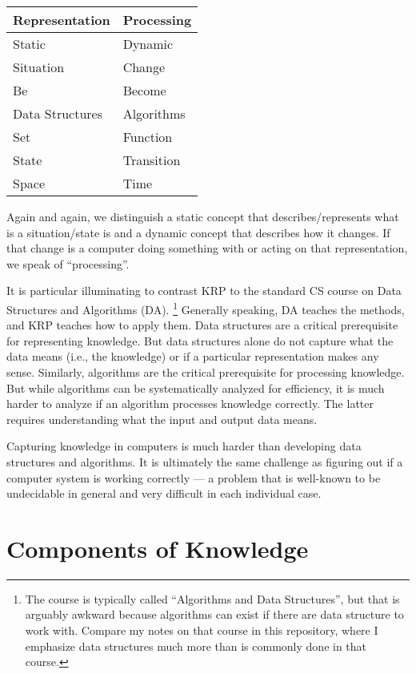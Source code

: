 \begin{center}
\begin{tabular}{l|l}
Representation & Processing \\
\hline
Static & Dynamic \\
Situation & Change \\
Be & Become \\
Data Structures & Algorithms \\
Set & Function \\
State & Transition \\
Space & Time
\end{tabular}
\end{center}

Again and again, we distinguish a static concept that describes/represents what is a situation/state is and a dynamic concept that describes how it changes.
If that change is a computer doing something with or acting on that representation, we speak of ``processing''.

It is particular illuminating to contrast KRP to the standard CS course on Data Structures and Algorithms (DA).%
\footnote{The course is typically called ``Algorithms and Data Structures'', but that is arguably awkward because algorithms can exist if there are data structure to work with. Compare my notes on that course in this repository, where I emphasize data structures much more than is commonly done in that course.}
Generally speaking, DA teaches the methods, and KRP teaches how to apply them.
Data structures are a critical prerequisite for representing knowledge.
But data structures alone do not capture what the data means (i.e., the knowledge) or if a particular representation makes any sense.
Similarly, algorithms are the critical prerequisite for processing knowledge.
But while algorithms can be systematically analyzed for efficiency, it is much harder to analyze if an algorithm processes knowledge correctly.
The latter requires understanding what the input and output data means.

Capturing knowledge in computers is much harder than developing data structures and algorithms.
It is ultimately the same challenge as figuring out if a computer system is working correctly --- a problem that is well-known to be undecidable in general and very difficult in each individual case.

\section{Components of Knowledge}


